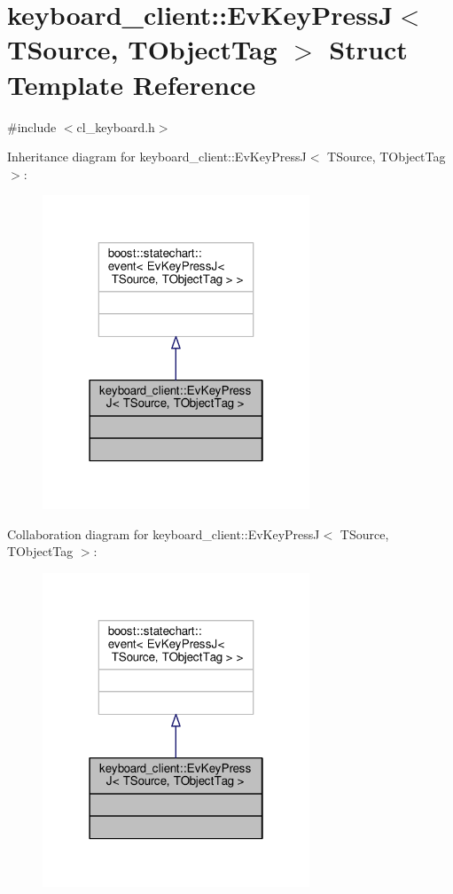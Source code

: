 \hypertarget{structkeyboard__client_1_1EvKeyPressJ}{}\section{keyboard\+\_\+client\+:\+:Ev\+Key\+PressJ$<$ T\+Source, T\+Object\+Tag $>$ Struct Template Reference}
\label{structkeyboard__client_1_1EvKeyPressJ}


{\ttfamily \#include $<$cl\+\_\+keyboard.\+h$>$}



Inheritance diagram for keyboard\+\_\+client\+:\+:Ev\+Key\+PressJ$<$ T\+Source, T\+Object\+Tag $>$\+:\nopagebreak
\begin{figure}[H]
\begin{center}
\leavevmode
\includegraphics[width=226pt]{structkeyboard__client_1_1EvKeyPressJ__inherit__graph}
\end{center}
\end{figure}


Collaboration diagram for keyboard\+\_\+client\+:\+:Ev\+Key\+PressJ$<$ T\+Source, T\+Object\+Tag $>$\+:\nopagebreak
\begin{figure}[H]
\begin{center}
\leavevmode
\includegraphics[width=226pt]{structkeyboard__client_1_1EvKeyPressJ__coll__graph}
\end{center}
\end{figure}


